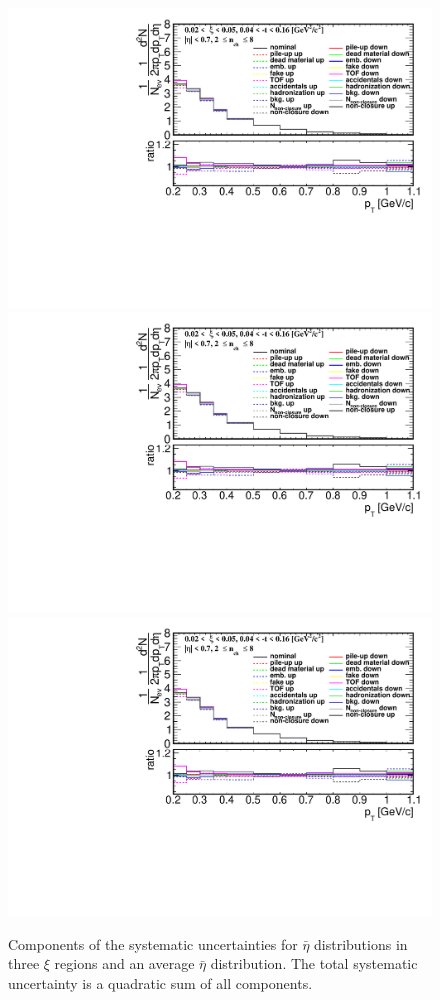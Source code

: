 \begin{figure}[h!]
	\hfill
	\includegraphics[width=.41\textwidth,page=11]{chapters/chrgSTAR/img/syst/out_chargedmax.pdf}
	\newline
	\includegraphics[width=.41\textwidth,page=17]{chapters/chrgSTAR/img/syst/out_chargedmax.pdf}
	\hfill
	\includegraphics[width=.41\textwidth,page=21]{chapters/chrgSTAR/img/syst/out_chargedmax.pdf}
	\caption[Components of the systematic uncertainties for $\bar{\eta}$ distributions in three $\xi$ regions and the average $\bar{\eta}$ distribution]{Components of the systematic uncertainties for $\bar{\eta}$ distributions in three $\xi$ regions and an average $\bar{\eta}$ distribution. The total  systematic uncertainty is a quadratic sum of all  components.}
	\label{fig:results_star_eta_syst}
\end{figure}



